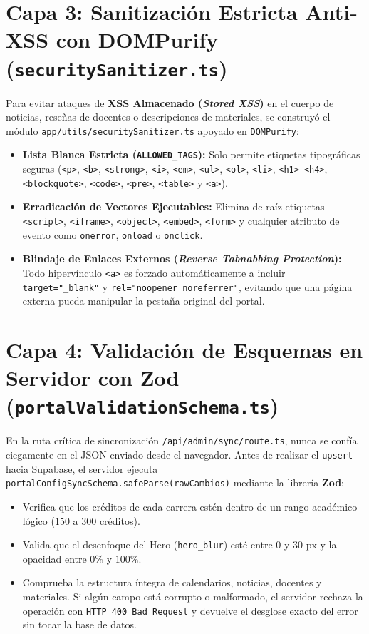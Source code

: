 \documentclass[12pt,a4paper,oneside]{report}
\begin{document}
\section{Capa 3: Sanitización Estricta Anti-XSS con DOMPurify (\texttt{securitySanitizer.ts})}
Para evitar ataques de \textbf{XSS Almacenado (\textit{Stored XSS})} en el cuerpo de noticias, reseñas de docentes o descripciones de materiales, se construyó el módulo \texttt{app/utils/securitySanitizer.ts} apoyado en \texttt{DOMPurify}:
\begin{itemize}[leftmargin=1.0cm]
  \item \textbf{Lista Blanca Estricta (\texttt{ALLOWED\_TAGS}):} Solo permite etiquetas tipográficas seguras (\texttt{<p>}, \texttt{<b>}, \texttt{<strong>}, \texttt{<i>}, \texttt{<em>}, \texttt{<ul>}, \texttt{<ol>}, \texttt{<li>}, \texttt{<h1>}--\texttt{<h4>}, \texttt{<blockquote>}, \texttt{<code>}, \texttt{<pre>}, \texttt{<table>} y \texttt{<a>}).
  \item \textbf{Erradicación de Vectores Ejecutables:} Elimina de raíz etiquetas \texttt{<script>}, \texttt{<iframe>}, \texttt{<object>}, \texttt{<embed>}, \texttt{<form>} y cualquier atributo de evento como \texttt{onerror}, \texttt{onload} o \texttt{onclick}.
  \item \textbf{Blindaje de Enlaces Externos (\textit{Reverse Tabnabbing Protection}):} Todo hipervínculo \texttt{<a>} es forzado automáticamente a incluir \texttt{target="\_blank"} y \texttt{rel="noopener noreferrer"}, evitando que una página externa pueda manipular la pestaña original del portal.
\end{itemize}

\section{Capa 4: Validación de Esquemas en Servidor con Zod (\texttt{portalValidationSchema.ts})}
En la ruta crítica de sincronización \texttt{/api/admin/sync/route.ts}, nunca se confía ciegamente en el JSON enviado desde el navegador. Antes de realizar el \texttt{upsert} hacia Supabase, el servidor ejecuta \texttt{portalConfigSyncSchema.safeParse(rawCambios)} mediante la librería \textbf{Zod}:
\begin{itemize}[leftmargin=1.0cm]
  \item Verifica que los créditos de cada carrera estén dentro de un rango académico lógico ($150$ a $300$ créditos).
  \item Valida que el desenfoque del Hero (\texttt{hero\_blur}) esté entre $0$ y $30\text{ px}$ y la opacidad entre $0\%$ y $100\%$.
  \item Comprueba la estructura íntegra de calendarios, noticias, docentes y materiales. Si algún campo está corrupto o malformado, el servidor rechaza la operación con \texttt{HTTP 400 Bad Request} y devuelve el desglose exacto del error sin tocar la base de datos.
\end{itemize}
\end{document}
